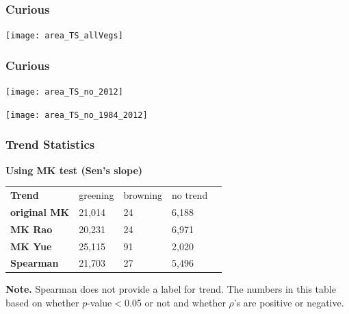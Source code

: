 \documentclass[serif, xcolor={dvipsnames}]{beamer} %
\begin{document}
\begin{frame}
 \frametitle{Curious}
\texttt{[image: area\_TS\_allVegs]}~%
\end{frame}
\begin{frame}
 \frametitle{Curious}
{\hspace*{-5mm}}
\begin{minipage}{.5\textwidth}
\texttt{[image: area\_TS\_no\_2012]}~%
\end{minipage}%
\hspace{.21cm}
\begin{minipage}{.5\textwidth}
\texttt{[image: area\_TS\_no\_1984\_2012]}~%
\end{minipage}
\end{frame}
\fi
\begin{frame}
\frametitle{Trend Statistics}

{\bf Using MK test (Sen's slope)}

\begin{table}[!ht]
\centering
\captionsetup{singlelinecheck=false, format=hang}
\label{tab:Trendcounts}
\begin{tabular}{lllll}
\bottomrule
\rowcolor{shadecolor} \textbf{Trend} & 
 greening & browning & no trend \\ 
\textbf{original MK}  & 21,014 & 24 & 6,188 \\
\rowcolor{shadecolor} \textbf{MK Rao}  & 20,231 & 24 & 6,971 \\
\textbf{MK Yue}  &  25,115 & 91 & 2,020 \\
\rowcolor{aliceblue}\textbf{Spearman}  & 21,703 & 27 & 5,496\\
\toprule
\end{tabular}
\end{table}
\begin{tcolorbox}
{\scriptsize{\bf Note.} Spearman does not provide a label for trend. The numbers
in this table based on whether $p$-value$<$0.05 or not and whether $\rho$'s are positive or negative.}
\end{tcolorbox}
\end{frame}
\end{document}
